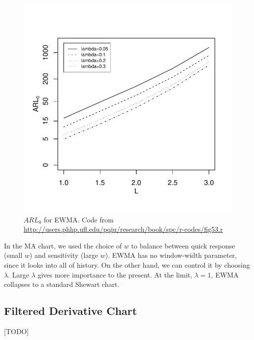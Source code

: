 \begin{figure}[h]
\centering
\includegraphics[height=0.3\textheight]{art/fig53}
\caption[$ARL_0$ for EWMA]{$ARL_0$ for EWMA. \newline Code from \url{http://users.phhp.ufl.edu/pqiu/research/book/spc/r-codes/fig53.r}}
\label{fig:arl_0_ewma}
\end{figure}

In the MA chart, we used the choice of $w$ to balance between quick response (small $w$) and sensitivity (large $w$).
EWMA has no window-width parameter, since it looks into all of history. On the other hand, we can control it by choosing $\lambda$. 
Large $\lambda$ gives more importance to the present. At the limit, $\lambda=1$, EWMA collapses to a standard Shewart chart.







\subsection{Filtered Derivative Chart}
[TODO]


